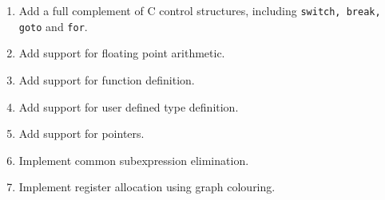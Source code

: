 \begin{enumerate}
\begin{enumerate}
\item Add a full complement of C control structures, including {\tt switch, break, goto} and
{\tt for}.
\item Add support for floating point arithmetic.
\item Add support for function definition.
\item Add support for user defined type definition.
\item Add support for pointers.
\item Implement common subexpression elimination.
\item Implement register allocation using graph colouring.
\end{enumerate}
\end{enumerate}








